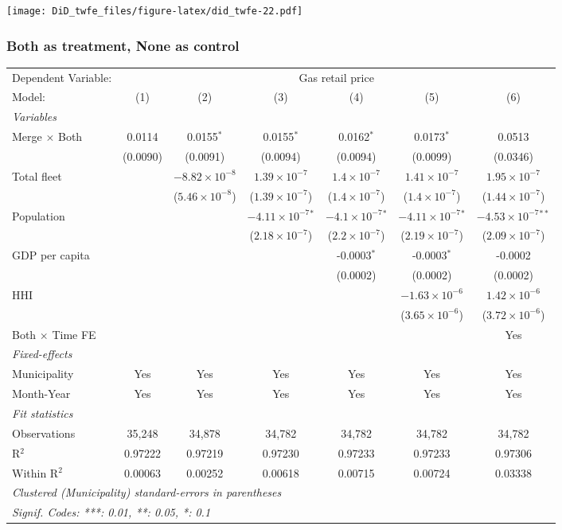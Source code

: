 \documentclass[
]{article}
\begin{document}
\texttt{[image: DiD\_twfe\_files/figure-latex/did\_twfe-22.pdf]}

\hypertarget{both-as-treatment-none-as-control}{%
\subsubsection{Both as treatment, None as
control}\label{both-as-treatment-none-as-control}}

\begin{tabular}{lcccccc}
\tabularnewline\midrule\midrule
Dependent Variable:&\multicolumn{6}{c}{Gas retail price}\\
Model:&(1) & (2) & (3) & (4) & (5) & (6)\\
\midrule \emph{Variables}&   &   &   &   &   &  \\
Merge $\times $ Both & 0.0114 & 0.0155$^{*}$ & 0.0155$^{*}$ & 0.0162$^{*}$ & 0.0173$^{*}$ & 0.0513\\
  &(0.0090) & (0.0091) & (0.0094) & (0.0094) & (0.0099) & (0.0346)\\
Total fleet &    & $-8.82\times 10^{-8}$ & $1.39\times 10^{-7}$ & $1.4\times 10^{-7}$ & $1.41\times 10^{-7}$ & $1.95\times 10^{-7}$\\
  &   & ($5.46\times 10^{-8}$) & ($1.39\times 10^{-7}$) & ($1.4\times 10^{-7}$) & ($1.4\times 10^{-7}$) & ($1.44\times 10^{-7}$)\\
Population &    &    & $-4.11\times 10^{-7}$$^{*}$ & $-4.1\times 10^{-7}$$^{*}$ & $-4.11\times 10^{-7}$$^{*}$ & $-4.53\times 10^{-7}$$^{**}$\\
  &   &    & ($2.18\times 10^{-7}$) & ($2.2\times 10^{-7}$) & ($2.19\times 10^{-7}$) & ($2.09\times 10^{-7}$)\\
GDP per capita &    &    &    & -0.0003$^{*}$ & -0.0003$^{*}$ & -0.0002\\
  &   &    &    & (0.0002) & (0.0002) & (0.0002)\\
HHI &    &    &    &    & $-1.63\times 10^{-6}$ & $1.42\times 10^{-6}$\\
  &   &    &    &    & ($3.65\times 10^{-6}$) & ($3.72\times 10^{-6}$)\\
Both $\times$ Time FE &  &  &  &  &  & Yes\\
\midrule \emph{Fixed-effects}&   &   &   &   &   &  \\
Municipality & Yes & Yes & Yes & Yes & Yes & Yes\\
Month-Year & Yes & Yes & Yes & Yes & Yes & Yes\\
\midrule \emph{Fit statistics}&  & & & & & \\
Observations & 35,248&34,878&34,782&34,782&34,782&34,782\\
R$^2$ & 0.97222&0.97219&0.97230&0.97233&0.97233&0.97306\\
Within R$^2$ & 0.00063&0.00252&0.00618&0.00715&0.00724&0.03338\\
\midrule\midrule\multicolumn{7}{l}{\emph{Clustered (Municipality) standard-errors in parentheses}}\\
\multicolumn{7}{l}{\emph{Signif. Codes: ***: 0.01, **: 0.05, *: 0.1}}\\
\end{tabular}
\end{document}
